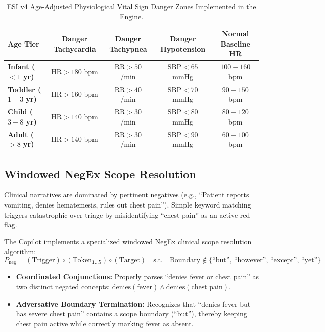 \documentclass[11pt,a4paper]{article}
\begin{document}
\begin{table}[htbp]
\centering
\small
\begin{tabularx}{\textwidth}{l c c c c}
\toprule
\textbf{Age Tier} & \textbf{Danger Tachycardia} & \textbf{Danger Tachypnea} & \textbf{Danger Hypotension} & \textbf{Normal Baseline HR} \\
\midrule
\textbf{Infant ($< 1$ yr)} & $\text{HR} > 180$ bpm & $\text{RR} > 50$ /min & $\text{SBP} < 65$ mmHg & $100 - 160$ bpm \\
\textbf{Toddler ($1 - 3$ yr)} & $\text{HR} > 160$ bpm & $\text{RR} > 40$ /min & $\text{SBP} < 70$ mmHg & $90 - 150$ bpm \\
\textbf{Child ($3 - 8$ yr)} & $\text{HR} > 140$ bpm & $\text{RR} > 30$ /min & $\text{SBP} < 80$ mmHg & $80 - 120$ bpm \\
\textbf{Adult ($> 8$ yr)} & $\text{HR} > 140$ bpm & $\text{RR} > 30$ /min & $\text{SBP} < 90$ mmHg & $60 - 100$ bpm \\
\bottomrule
\end{tabularx}
\caption{ESI v4 Age-Adjusted Physiological Vital Sign Danger Zones Implemented in the Engine.}
\label{tab:pediatric_vitals}
\end{table}

\subsection{Windowed NegEx Scope Resolution}
Clinical narratives are dominated by pertinent negatives (e.g., ``Patient reports vomiting, denies hematemesis, rules out chest pain''). Simple keyword matching triggers catastrophic over-triage by misidentifying ``chest pain'' as an active red flag. 

The Copilot implements a specialized windowed NegEx clinical scope resolution algorithm:
\begin{equation}
    P_{\text{neg}} = \left( \text{Trigger} \right) \circ \left( \text{Token}_{1 \dots 5} \right) \circ \left( \text{Target} \right) \quad \text{s.t.} \quad \text{Boundary} \notin \{\text{``but'', ``however'', ``except'', ``yet''}\}
\end{equation}
\begin{itemize}[leftmargin=1.5em]
    \item \textbf{Coordinated Conjunctions:} Properly parses ``denies fever or chest pain'' as two distinct negated concepts: $\text{denies}(\text{fever}) \land \text{denies}(\text{chest pain})$.
    \item \textbf{Adversative Boundary Termination:} Recognizes that ``denies fever but has severe chest pain'' contains a scope boundary (``but''), thereby keeping chest pain active while correctly marking fever as absent.
\end{itemize}
\end{document}
